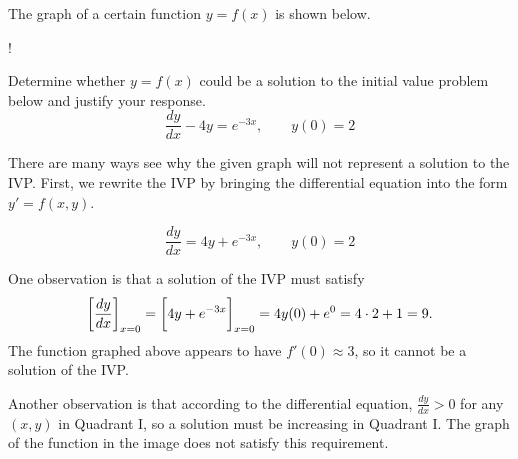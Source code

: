 \documentclass[noauthor]{ximera}
\begin{document}
\begin{problem}
The graph of a certain function $y=f(x)$ is shown below.

\begin{center}
\resizebox {5.0cm} {!} { }
\end{center}

Determine whether $y=f(x)$ could be a solution to the initial value problem below and justify your response. 
\[
\dfrac{dy}{dx}-4y=e^{-3x} , \qquad y(0)=2
\]

\begin{freeResponse}
There are many ways see why the given graph will not represent a solution to the IVP.  First, we rewrite the IVP by bringing the differential equation into the form $y'=f(x,y)$.

\[
\dfrac{dy}{dx}=4y+e^{-3x} , \qquad y(0)=2
\]


One observation is that a solution of the IVP must satisfy
$$
\bigg[ \frac{dy}{dx} \bigg]_{x=0} = \bigg[ 4y + e^{-3x} \bigg]_{x=0} = 4y(0) + e^0 = 4 \cdot 2 + 1 = 9.
$$
The function graphed above appears to have $f'(0) \approx 3$, so it cannot be a solution of the IVP.

Another observation is that according to the differential equation, $\frac{dy}{dx} >0$ for any $(x,y)$ in Quadrant I, so a solution must be increasing in Quadrant I.  The graph of the function in the image does not satisfy this requirement.
\end{freeResponse}


\end{problem}
\end{document}
